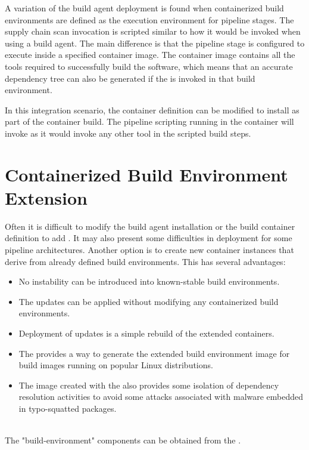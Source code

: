 A variation of the build agent deployment is found when containerized
build environments are defined as the execution environment for
pipeline stages.  The supply chain scan invocation is scripted similar
to how it would be invoked when using a build agent.  The main difference
is that the pipeline stage is configured to execute inside a specified
container image.  The container image contains all the tools required
to successfully build the software, which means that an accurate
dependency tree can also be generated if the \scaresolver is invoked
in that build environment.

In this integration scenario, the container definition can be modified to install \scaresolver
as part of the container build.  The pipeline scripting running in the container
will invoke \scaresolver as it would invoke any other tool in the scripted
build steps.  

\section{Containerized Build Environment Extension}\label{sec:extending_environment}

Often it is difficult to modify the build agent installation or the build
container definition to add \scaresolver.  It may also present some
difficulties in deployment for some pipeline architectures.  Another option
is to create new container instances that derive from already defined build
environments.  This has several advantages:

\begin{itemize}
    \item No instability can be introduced into known-stable build environments.
    \item The \scaresolver updates can be applied without modifying any 
    containerized build environments.
    \item Deployment of updates is a simple rebuild of the extended containers.
    \item The \cxtoolkit provides a way to generate the extended build 
    environment image for build images running on popular Linux distributions.
    \item The image created with the \cxtoolkit also provides some isolation of 
    dependency resolution activities to avoid some attacks associated with 
    malware embedded in typo-squatted packages.
\end{itemize}

\noindent\\The "build-environment" components can be obtained from the .

